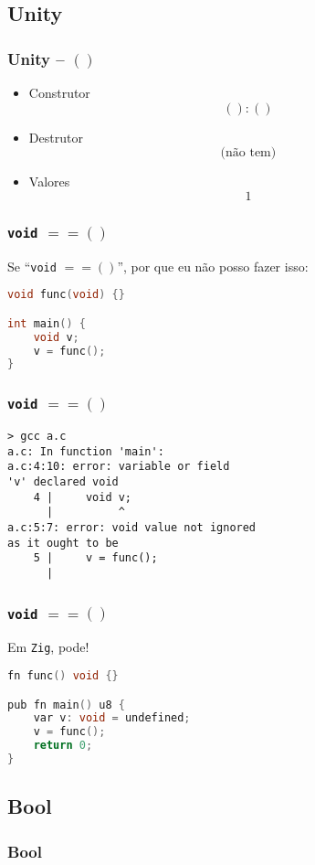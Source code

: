 \documentclass{beamer}
\newcommand{\lang}[1]{\texttt{#1}}
\newcommand{\inlcode}[1]{\texttt{#1}}
\begin{document}
\subsection{Unity}
\begin{frame}
    \frametitle{Unity -- \(()\)}
    \begin{itemize}
        \item Construtor
            \[
                () : ()
            \]
            \vfill
        \item Destrutor
            \[
                \text{(não tem)}
            \]
            \vfill
        \item Valores
            \[
                1
            \]
    \end{itemize}
\end{frame}

\begin{frame}[fragile]
    \frametitle{\inlcode{void} \(== ()\)}
    Se ``\inlcode{void} \(== ()\)'',
    por que eu não posso fazer isso:
    \vfill
    \begin{lstlisting}[language=C]
void func(void) {}

int main() {
    void v;
    v = func();
}
    \end{lstlisting}
\end{frame}

\begin{frame}[fragile]
    \frametitle{\inlcode{void} \(== ()\)}
    \begin{lstlisting}
> gcc a.c
a.c: In function 'main':
a.c:4:10: error: variable or field
'v' declared void
    4 |     void v;
      |          ^
a.c:5:7: error: void value not ignored
as it ought to be
    5 |     v = func();
      |
    \end{lstlisting}
\end{frame}

\begin{frame}[fragile]
    \frametitle{\inlcode{void} \(== ()\)}
    Em \lang{Zig}, pode!
    \vfill
    \begin{lstlisting}[language=C]
fn func() void {}

pub fn main() u8 {
    var v: void = undefined;
    v = func();
    return 0;
}
    \end{lstlisting}
\end{frame}

\subsection{Bool}
\begin{frame}
    \frametitle{Bool}
\end{frame}
\end{document}

